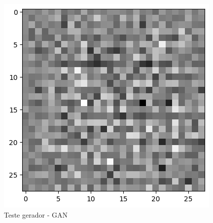 \begin{figure}[H]
\centering
\includegraphics[width=.7\linewidth]{apendices/fig/9_IAA009_7.png}
\caption{Teste gerador - GAN}
\end{figure}


